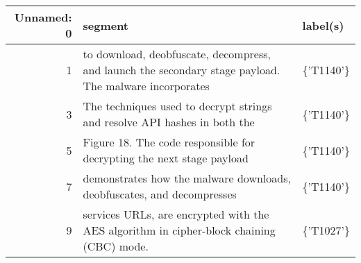 \begin{tabular}{rll}
\toprule
Unnamed: 0 & segment & label(s) \\
\midrule
1 & to download, deobfuscate, decompress, and launch the secondary stage payload. The malware incorporates & \{'T1140'\} \\
3 & The techniques used to decrypt strings and resolve API hashes in both the & \{'T1140'\} \\
5 & Figure 18. The code responsible for decrypting the next stage payload  & \{'T1140'\} \\
7 & demonstrates how the malware downloads, deobfuscates, and decompresses  & \{'T1140'\} \\
9 & services URLs, are encrypted with the AES algorithm in cipher-block chaining (CBC) mode. & \{'T1027'\} \\
\bottomrule
\end{tabular}
